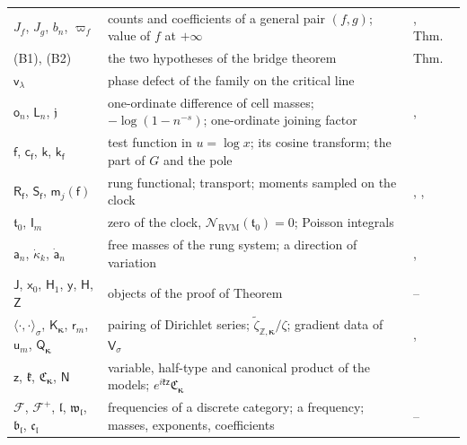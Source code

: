 \documentclass[11pt,reqno]{amsart}
\makeatletter
\let\CG@origref\ref
\let\CG@origeqref\eqref
\newcommand{\CG@gettip}[1]{\@ifundefined{CGTip@#1}{Reference: #1}{\csname CGTip@#1\endcsname}}
\DeclareRobustCommand{\CGref}[1]{\pdftooltip{\CG@origref{#1}}{\CG@gettip{#1}}}
\DeclareRobustCommand{\CGeqref}[1]{\pdftooltip{\CG@origeqref{#1}}{\CG@gettip{#1}}}
\numberwithin{equation}{section}
\theoremstyle{plain}
\theoremstyle{definition}
\theoremstyle{remark}
\newcommand{\Z}{\mathbb Z}
\newcommand{\RVM}{\mathrm{RVM}}
\newcommand{\NR}{\mathcal N_{\RVM}}
\makeatother
\begin{document}
{\begin{longtable}{>{\raggedright\arraybackslash}p{}>{\raggedright\arraybackslash}p{}>{\raggedright\arraybackslash}p{}}
$J_f$, $J_g$, $b_n$, $\varpi_f$ & counts and coefficients of a general pair $(f,g)$; value of $f$ at $+\infty$ & \CGeqref{eq:halfline-f}, Thm.~\CGref{thm:bridge}\\
\textup{(B1)}, \textup{(B2)} & the two hypotheses of the bridge theorem & Thm.~\CGref{thm:bridge}\\
$\mathsf v_\lambda$ & phase defect of the family on the critical line & \CGeqref{eq:phase-defect}\\
$\mathsf o_n$, $\mathsf L_n$, $\mathfrak j$ & one-ordinate difference of cell masses; $-\log(1-n^{-s})$; one-ordinate joining factor & \CGeqref{eq:one-ordinate}, \CGeqref{eq:one-ordinate-joining}\\
$\mathsf f$, $\mathsf c_{\mathsf f}$, $\mathsf k$, $\mathsf k_{\mathsf f}$ & test function in $u=\log x$; its cosine transform; the part of $G$ and the pole & \CGeqref{eq:transport-defs}\\
$\mathsf R_{\mathsf f}$, $\mathsf S_{\mathsf f}$, $\mathsf m_j(\mathsf f)$ & rung functional; transport; moments sampled on the clock & \CGeqref{eq:rung-functional}, \CGeqref{eq:transport}, \CGeqref{eq:transport-moments}\\
$\mathfrak t_0$, $\mathsf I_m$ & zero of the clock, $\NR(\mathfrak t_0)=0$; Poisson integrals & \CGeqref{eq:clock-defect-poisson}\\
$\mathsf a_n$, $\dot\kappa_k$, $\dot{\mathsf a}_n$ & free masses of the rung system; a direction of variation & \CGeqref{eq:rung-system}, \CGeqref{eq:rung-linearized}\\
$\mathsf J$, $\mathsf x_0$, $\mathsf H_1$, $\mathsf y$, $\mathsf H$, $\mathsf Z$ & objects of the proof of Theorem~\CGref{thm:nondegenerate} & \CGeqref{eq:nondeg-H1}--\CGeqref{eq:nondeg-H}\\
$\langle\cdot,\cdot\rangle_\sigma$, $\mathsf K_{\boldsymbol{\kappa}}$, $\mathsf r_m$, $\mathsf u_m$, $\mathsf Q_{\boldsymbol{\kappa}}$ & pairing of Dirichlet series; $\tilde\zeta_{\Z,\boldsymbol{\kappa}}/\zeta$; gradient data of $\mathsf V_\sigma$ & \CGeqref{eq:K-kappa}, \CGeqref{eq:gradient}\\
$\mathsf z$, $\mathfrak k$, $\mathfrak C_{\boldsymbol{\kappa}}$, $\mathsf N$ & variable, half-type and canonical product of the models; $e^{i\mathfrak k\mathsf z}\mathfrak C_{\boldsymbol{\kappa}}$ & \CGeqref{eq:model-product}\\
$\mathscr F$, $\mathscr F^{+}$, $\mathfrak l$, $\mathfrak w_{\mathfrak l}$, $\mathfrak b_{\mathfrak l}$, $\mathfrak c_{\mathfrak l}$ & frequencies of a discrete category; a frequency; masses, exponents, coefficients & \CGeqref{eq:acceptance-density}--\CGeqref{eq:acceptance-window}\\

\end{longtable}}
\end{document}

